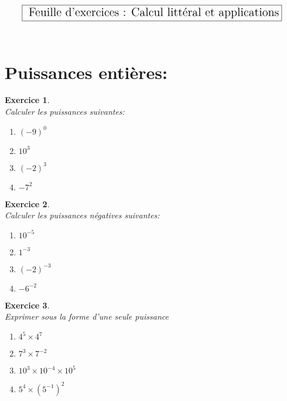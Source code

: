 \documentclass[a4paper,10pt]{article}
\newtheorem{exer}{Exercice}
\begin{document}
 $$\fbox{\text{\Large{ Feuille d'exercices : Calcul littéral et applications}}}$$
 \hfil\\
\section*{Puissances entières:}

\begin{minipage}[t]{1\linewidth}
	\begin{minipage}[t]{0.4\linewidth}
		\raggedright
		\begin{exer}\quad\\
			Calculer les puissances suivantes:\hfill\textbf{}\\
			\begin{multicols}{2}
				\begin{enumerate}
					\item $(-9)^0 $
					\item $10^3$
				
					\item $(-2)^3$
					\item $-7^2 $
					
				\end{enumerate}
			\end{multicols}
		\end{exer}
		\begin{exer}\quad\hfill\textbf{}\\
		Calculer les puissances négatives suivantes:
			\begin{multicols}{2}
			\begin{enumerate}
				\item $10^{-5} $
				\item $1^{-3} $
				
				\item $(-2)^{-3} $
				\item $-6^{-2} $
			\end{enumerate}
		\end{multicols}
	\end{exer}
	\begin{exer}\quad\hfill\textbf{}\\
		Exprimer sous la forme d'une seule puissance
			\begin{multicols}{2}
			\begin{enumerate}
				\item $4^5 \times 4^7$
				\item $7^3 \times 7^{-2} $
			
				\item $10^3 \times 10^{-4} \times 10^5 $
				\item $5^4\times (5^{-1})^2 $
			\end{enumerate}


\end{multicols}
\end{exer}
\end{minipage}
\end{minipage}
\end{document}
